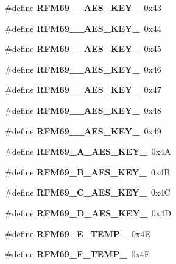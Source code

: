 \begin{DoxyCompactItemize}
\item 
\mbox{\label{_r_f_m69__registri_8h_aa558003f813c8096371e930d55dcdedd}} 
\#define {\bfseries R\+F\+M69\+\_\+\_\+\+A\+E\+S\+\_\+\+K\+E\+Y\+\_}~0x43
\item 
\mbox{\label{_r_f_m69__registri_8h_ae1d342c62644e63a4f12f277b8fc226d}} 
\#define {\bfseries R\+F\+M69\+\_\+\_\+\+A\+E\+S\+\_\+\+K\+E\+Y\+\_}~0x44
\item 
\mbox{\label{_r_f_m69__registri_8h_ac04731753795898dc5b055da2db8eeeb}} 
\#define {\bfseries R\+F\+M69\+\_\+\_\+\+A\+E\+S\+\_\+\+K\+E\+Y\+\_}~0x45
\item 
\mbox{\label{_r_f_m69__registri_8h_a9e305672491497d12ffbe4be6098e6da}} 
\#define {\bfseries R\+F\+M69\+\_\+\_\+\+A\+E\+S\+\_\+\+K\+E\+Y\+\_}~0x46
\item 
\mbox{\label{_r_f_m69__registri_8h_a41f7e564aa0eb81f2b1eb857e4a0a085}} 
\#define {\bfseries R\+F\+M69\+\_\+\_\+\+A\+E\+S\+\_\+\+K\+E\+Y\+\_}~0x47
\item 
\mbox{\label{_r_f_m69__registri_8h_ab94bbfc5bb2ad62b88886a993a97e5fb}} 
\#define {\bfseries R\+F\+M69\+\_\+\_\+\+A\+E\+S\+\_\+\+K\+E\+Y\+\_}~0x48
\item 
\mbox{\label{_r_f_m69__registri_8h_aff4f800d8d13efc29deeb8c87166de1c}} 
\#define {\bfseries R\+F\+M69\+\_\+\_\+\+A\+E\+S\+\_\+\+K\+E\+Y\+\_}~0x49
\item 
\mbox{\label{_r_f_m69__registri_8h_ac0ad3e053d1f984eaf6182f922803107}} 
\#define {\bfseries R\+F\+M69\+\_\+A\+\_\+\+A\+E\+S\+\_\+\+K\+E\+Y\+\_}~0x4A
\item 
\mbox{\label{_r_f_m69__registri_8h_aee08018bbcb5de24ce8efe5de862ff2c}} 
\#define {\bfseries R\+F\+M69\+\_\+B\+\_\+\+A\+E\+S\+\_\+\+K\+E\+Y\+\_}~0x4B
\item 
\mbox{\label{_r_f_m69__registri_8h_a2fe4aae1d797a01c730a491c4deb04f6}} 
\#define {\bfseries R\+F\+M69\+\_\+C\+\_\+\+A\+E\+S\+\_\+\+K\+E\+Y\+\_}~0x4C
\item 
\mbox{\label{_r_f_m69__registri_8h_a194531e68de7908d228975c7535f296e}} 
\#define {\bfseries R\+F\+M69\+\_\+D\+\_\+\+A\+E\+S\+\_\+\+K\+E\+Y\+\_}~0x4D
\item 
\mbox{\label{_r_f_m69__registri_8h_a4156a3da13e2d6e056c739a616ce1a14}} 
\#define {\bfseries R\+F\+M69\+\_\+E\+\_\+\+T\+E\+M\+P\+\_}~0x4E
\item 
\mbox{\label{_r_f_m69__registri_8h_abbde30c871a397c94115c48d2ea81866}} 
\#define {\bfseries R\+F\+M69\+\_\+F\+\_\+\+T\+E\+M\+P\+\_}~0x4F
\item 

\end{DoxyCompactItemize}

